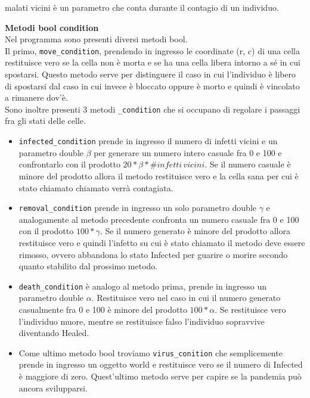 \documentclass{article}
\begin{document}
\begin{enumerate}
{    malati vicini è un parametro che conta durante il contagio di un individuo. 
    \item \textbf{Metodi bool condition}\\
    Nel programma sono presenti diversi metodi bool. \\
    Il primo, \verb|move_condition|, prendendo in ingresso le coordinate (r, c) di una 
    cella restituisce vero se la cella non è morta e se ha una cella libera intorno a 
    sé in cui spostarsi. Questo metodo serve per distinguere il caso in cui l'individuo 
    è libero di spostarsi dal caso in cui invece è bloccato oppure è morto e quindi è 
    vincolato a rimanere dov'è. \\
    Sono inoltre presenti 3 metodi \verb|_condition| che si occupano di regolare i 
    passaggi fra gli stati delle celle. 
    \begin{itemize}
        \item \verb|infected_condition| prende in ingresso il numero di infetti vicini 
        e un parametro double $\beta$ per generare un numero intero casuale fra 0 e 100 
        e confrontarlo con il prodotto $20*\beta*\# infetti\, vicini$. Se il numero 
        casuale è minore del prodotto allora il metodo restituisce vero e la cella 
        sana per cui è stato chiamato chiamato verrà contagiata. 
        \item \verb|removal_condition| prende in ingresso un solo parametro double 
        $\gamma$ e analogamente al metodo precedente confronta un numero casuale fra 0 
        e 100 con il prodotto $100 *\gamma$. 
        Se il numero generato è minore del prodotto allora restituisce vero e quindi 
        l'infetto su cui è stato chiamato il metodo deve essere rimosso, ovvero 
        abbandona lo stato Infected per guarire o morire secondo quanto stabilito dal 
        prossimo metodo. 
        \item \verb|death_condition| è analogo al metodo prima, prende in ingresso un 
        parametro double $\alpha$. 
        Restituisce vero nel caso in cui il numero generato casualmente fra 0 e 100 
        è minore del prodotto $100 * \alpha$. Se restituisce vero l'individuo muore, 
        mentre se restituisce falso l'individuo sopravvive diventando Healed. 
        \item Come ultimo metodo bool troviamo \verb|virus_conition| che semplicemente 
        prende in ingresso un oggetto world e restituisce vero se il numero di Infected 
        è maggiore di zero. 
        Quest'ultimo metodo serve per capire se la pandemia può ancora svilupparsi. 

\end{itemize}}
\end{enumerate}
\end{document}
